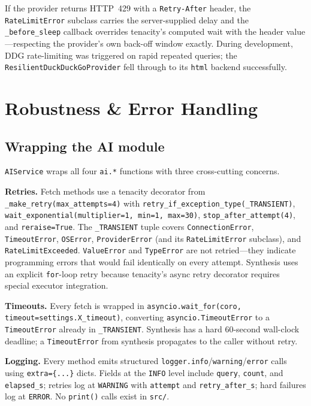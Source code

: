\documentclass[11pt,a4paper]{article}
\begin{document}
If the provider returns HTTP~429 with a \texttt{Retry-After} header, the
\texttt{RateLimitError} subclass carries the server-supplied delay and the
\texttt{\_before\_sleep} callback overrides tenacity's computed wait with the header
value---respecting the provider's own back-off window exactly. During development, DDG
rate-limiting was triggered on rapid repeated queries; the
\texttt{ResilientDuckDuckGoProvider} fell through to its \texttt{html} backend
successfully.

\section{Robustness \& Error Handling}\label{sec:robustness}

\subsection{Wrapping the AI module}

\texttt{AIService} wraps all four \texttt{ai.*} functions with three cross-cutting
concerns.

\textbf{Retries.}
Fetch methods use a tenacity decorator from
\texttt{\_make\_retry(max\_attempts=4)} with
\texttt{retry\_if\_exception\_type(\_TRANSIENT)},
\texttt{wait\_exponential(multiplier=1, min=1, max=30)},
\texttt{stop\_after\_attempt(4)}, and \texttt{reraise=True}.
The \texttt{\_TRANSIENT} tuple covers \texttt{ConnectionError}, \texttt{TimeoutError},
\texttt{OSError}, \texttt{ProviderError} (and its \texttt{RateLimitError} subclass),
and \texttt{RateLimitExceeded}. \texttt{ValueError} and \texttt{TypeError} are not
retried---they indicate programming errors that would fail identically on every attempt.
Synthesis uses an explicit \texttt{for}-loop retry because tenacity's async retry
decorator requires special executor integration.

\textbf{Timeouts.}
Every fetch is wrapped in
\texttt{asyncio.wait\_for(coro,\,timeout=settings.X\_timeout)}, converting
\texttt{asyncio.TimeoutError} to a \texttt{TimeoutError} already in
\texttt{\_TRANSIENT}. Synthesis has a hard 60-second wall-clock deadline; a
\texttt{TimeoutError} from synthesis propagates to the caller without retry.

\textbf{Logging.}
Every method emits structured \texttt{logger.info}/\texttt{warning}/\texttt{error}
calls using \texttt{extra=\{...\}} dicts. Fields at the \texttt{INFO} level include
\texttt{query}, \texttt{count}, and \texttt{elapsed\_s}; retries log at
\texttt{WARNING} with \texttt{attempt} and \texttt{retry\_after\_s}; hard failures log
at \texttt{ERROR}. No \texttt{print()} calls exist in \texttt{src/}.
\end{document}

